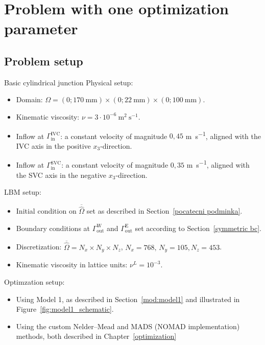 \section{Problem with one optimization parameter}

\subsection{Problem setup}
\begin{problem}{Basic cylindrical junction}
	\vspace{2mm}
	Physical setup:
	\begin{itemize}
		\item Domain: $ \Omega=(0 ; 170 \mathrm{~mm}) \times(0 ; 22 \mathrm{~mm}) \times(0 ; 100 \mathrm{~mm})$.
		\item Kinematic viscosity: $ \nu=3 \cdot 10^{-6} \mathrm{~m}^{2} \mathrm{~s}^{-1}$.
		\item Inflow at $\Gamma^{\text{IVC}}_{\text{in}}$: a constant velocity of magnitude $0{,}45$ \si{m s^{-1}},  aligned with the IVC axis in the positive $x_3$-direction.
		\item Inflow at $\Gamma^{\text{SVC}}_{\text{in}}$: a constant velocity of magnitude $0{,}35$ \si{m s^{-1}}, aligned with the SVC axis in the negative $x_3$-direction.
	\end{itemize} 
	LBM setup:
	\begin{itemize}
		\item Initial condition on $ \overline{\hat{\Omega}} $ set as described in Section~\ref{pocatecni podminka}.
		\item Boundary conditions at $\Gamma^{\text{W}}_{\text{out}}$ and $\Gamma^{\text{E}}_{\text{out}}$ set according to Section~\ref{symmetric bc}.
		\item Discretization: $\overline{\hat{\Omega}} = N_{x} \times N_{y} \times N_{z}$, $N_{x} = 768, \, N_{y} = 105, N_{z} = 453$.
		\item Kinematic viscosity in lattice units: $\nu^{L} = 10^{-3} $.
	\end{itemize}
	Optimzation setup:
	\begin{itemize}
		\item Using Model 1, as described in Section~\ref{mod:model1} and illustrated in Figure~\ref{fig:model1_schematic}.
		\item Using the custom Nelder–Mead and MADS (NOMAD implementation) methods, both described in Chapter~\ref{optimization}
	\end{itemize}
	\label{prob:1}
\end{problem}
\newpage
